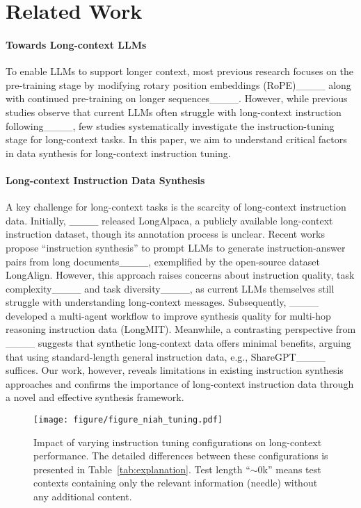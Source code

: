 \section{Related Work}
\paragraph{Towards Long-context LLMs}
To enable LLMs to support longer context, most previous research focuses on the pre-training stage by modifying rotary position embeddings (RoPE)____ along with continued pre-training on longer sequences____.
However, while previous studies observe that current LLMs often struggle with long-context instruction following____, few studies systematically investigate the instruction-tuning stage for long-context tasks.
In this paper, we aim to understand critical factors in data synthesis for long-context instruction tuning.

\noindent\paragraph{Long-context Instruction Data Synthesis}
A key challenge for long-context tasks is the scarcity of long-context instruction data.
Initially, ____ released LongAlpaca, a publicly available long-context instruction dataset, though its annotation process is unclear.
Recent works propose ``instruction synthesis'' to prompt LLMs to generate instruction-answer pairs from long documents____, exemplified by the open-source dataset LongAlign.
However, this approach raises concerns about instruction quality, task complexity____ and task diversity____, as current LLMs themselves still struggle with understanding long-context messages.
Subsequently, ____ developed a multi-agent workflow to improve synthesis quality for multi-hop reasoning instruction data (LongMIT).
Meanwhile, a contrasting perspective from ____ suggests that synthetic long-context data offers minimal benefits, arguing that using standard-length general instruction data, e.g., ShareGPT____ suffices.
Our work, however, reveals limitations in existing instruction synthesis approaches and confirms the importance of long-context instruction data through a novel and effective synthesis framework.

\begin{figure*}[ht!]
    \centering
    \texttt{[image: figure/figure\_niah\_tuning.pdf]}
    \caption{Impact of varying instruction tuning configurations on long-context performance. The detailed differences between these configurations is presented in Table~\ref{tab:explanation}. Test length ``$\sim$0k''  means test contexts containing only the relevant information (needle) without any additional content.}
   \label{fig:niah}
\end{figure*}

